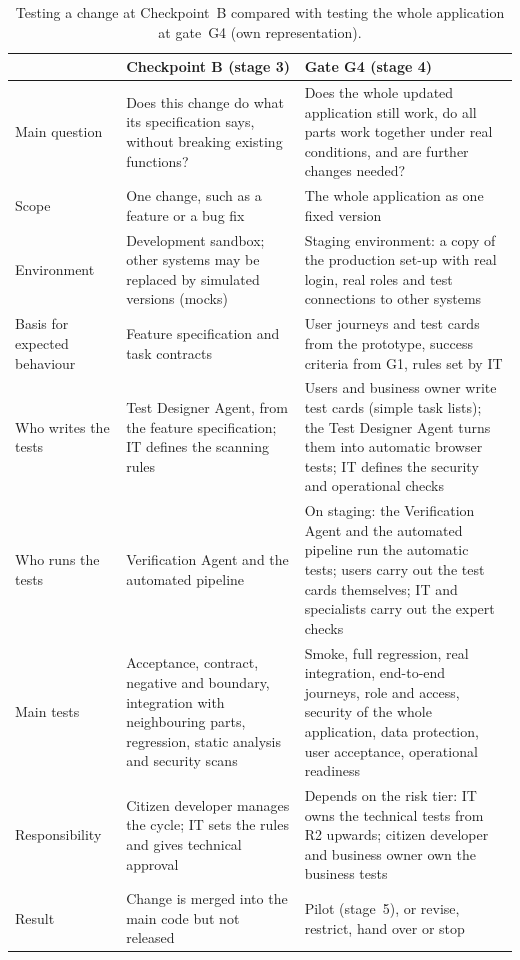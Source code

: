 \documentclass[10pt,a4paper]{article}
\begin{document}
\begin{table}[H]
    \centering
    \small
    \caption{Testing a change at Checkpoint~B compared with testing the whole
    application at gate~G4 (own representation).}
    \label{tab:change-vs-application-testing}
    \begin{tabular}{p{3.0cm} p{5.6cm} p{5.6cm}}
    \hline
    & \textbf{Checkpoint B (stage 3)} & \textbf{Gate G4 (stage 4)} \\
    \hline
    Main question & Does this change do what its specification says,
        without breaking existing functions? & Does the whole updated
        application still work, do all parts work together under real
        conditions, and are further changes needed? \\
    Scope & One change, such as a feature or a bug fix & The whole
        application as one fixed version \\
    Environment & Development sandbox; other systems may be replaced by
        simulated versions (mocks) & Staging environment: a copy of the
        production set-up with real login, real roles and test connections
        to other systems \\
    Basis for expected behaviour & Feature specification and task
        contracts & User journeys and test cards from the prototype,
        success criteria from G1, rules set by IT \\
    Who writes the tests & Test Designer Agent, from the feature
        specification; IT defines the scanning rules & Users and business
        owner write test cards (simple task lists); the Test Designer Agent
        turns them into automatic browser tests; IT defines the security
        and operational checks \\
    Who runs the tests & Verification Agent and the automated pipeline &
        On staging: the Verification Agent and the automated pipeline run
        the automatic tests; users carry out the test cards themselves;
        IT and specialists carry out the expert checks \\
    Main tests & Acceptance, contract, negative and boundary, integration
        with neighbouring parts, regression, static analysis and security
        scans & Smoke, full regression, real integration, end-to-end
        journeys, role and access, security of the whole application, data
        protection, user acceptance, operational readiness \\
    Responsibility & Citizen developer manages the cycle; IT sets the rules
        and gives technical approval & Depends on the risk tier: IT owns the
        technical tests from R2 upwards; citizen developer and business owner
        own the business tests \\
    Result & Change is merged into the main code but not released & Pilot
        (stage~5), or revise, restrict, hand over or stop \\
    \hline
    \end{tabular}
\end{table}
\end{document}
